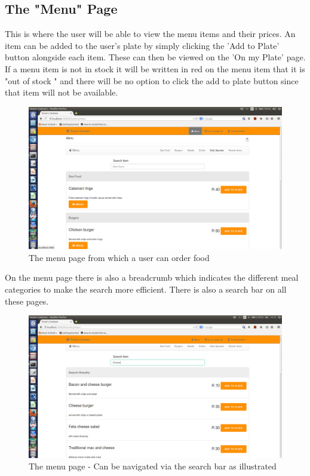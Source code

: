 \documentclass[a4paper,12pt]{report}
\begin{document}
\subsection{The "Menu" Page} 
This is where the user will be able to view the menu items and their prices. An item can be added to the user's plate by simply clicking the 'Add to Plate' button alongside each item. These can then be viewed on the 'On my Plate' page.
If a menu item is not in stock it will be written in red on the menu item that it is "out of stock " and there will be no  option to click the add to plate button since that item will not be available. 
\\
\begin{figure}[H]
  \centering
    \includegraphics[width=1.0\textwidth]{screenshots/beforePasta.png}
    \caption{The menu page from which a user can order food} 
\end{figure}
On the menu page there is also a breadcrumb which indicates the different meal categories to make the search more efficient. There is also a search bar on all these pages. 

\begin{figure}[H]
  \centering
    \includegraphics[width=1.0\textwidth]{screenshots/searchCheese.png}
    \caption{The menu page - Can be navigated via the search bar as illustrated} 
\end{figure}
\end{document}
